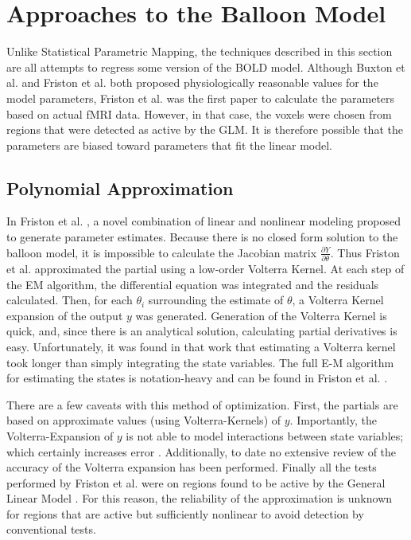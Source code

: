 \section{Approaches to the Balloon Model}
Unlike Statistical Parametric Mapping, the techniques described in this
section are all attempts to regress some version of the \ac{BOLD} model. 
Although Buxton et al. \cite{Buxton1998} and Friston et al. \cite{Friston2000}
both proposed physiologically reasonable values for the model parameters, 
Friston et al. \cite{Friston2002b} was the first paper to calculate the 
parameters based on actual \ac{fMRI} data. 
However, in that case, the voxels were chosen from
regions that were detected as active by the \ac{GLM}. It is therefore possible
that the parameters are biased toward parameters that fit the linear model.

\subsection{Polynomial Approximation}
\label{sec:Background Linear Approximation}
In Friston et al. \cite{Friston2002b}, a novel combination of 
linear and nonlinear modeling proposed to generate parameter estimates. 
Because there is no closed 
form solution to the balloon model, it is impossible to 
calculate the Jacobian matrix $\frac{\partial Y}{\partial \theta}$. Thus 
Friston et al. \cite{Friston2002b} approximated the partial using a
low-order Volterra Kernel. 
At each step of the \ac{EM} algorithm, 
the differential equation was integrated and the residuals
calculated. Then, for each $\theta_i$ surrounding the estimate of 
$\theta$, a Volterra Kernel expansion of the output $y$ was generated. Generation
of the Volterra Kernel is quick, and, since there
is an analytical solution, calculating partial derivatives is easy. 
Unfortunately, it was found in that work that estimating a Volterra kernel
took longer than simply integrating the state variables. 
The full E-M algorithm for estimating the states is notation-heavy 
 and can be found in Friston et al. \cite{Friston2002b}.

There are a few caveats with this method of optimization. First, the 
partials are based on approximate values (using Volterra-Kernels) of $y$.
Importantly, the Volterra-Expansion of $y$ is not able to model interactions
between state variables; which certainly increases error \cite{Friston2002b}.
Additionally, to date no extensive review of the accuracy of the 
Volterra expansion has been performed. Finally all the tests performed
by Friston et al. were on regions found to be active by the General
Linear Model \cite{Friston2002b}. For this reason, the reliability of 
the approximation is unknown for regions that are active but sufficiently 
nonlinear to avoid detection by conventional tests.

